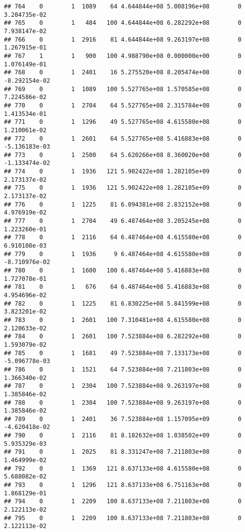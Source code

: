 \documentclass[
]{article}
\begin{document}
\begin{enumerate}
\begin{verbatim}
## 764    0        1  1089    64 4.644844e+08 5.008196e+08        0  3.204735e-02
## 765    0        1   484   100 4.644844e+08 6.282292e+08        0  7.938147e-02
## 766    0        1  2916    81 4.644844e+08 9.263197e+08        0  1.267915e-01
## 767    1        1   900   100 4.988790e+08 0.000000e+00        0  1.076149e-01
## 768    0        1  2401    16 5.275520e+08 8.205474e+08        0 -8.292154e-02
## 769    0        1  1089   100 5.527765e+08 1.570585e+08        0  7.224586e-02
## 770    0        1  2704    64 5.527765e+08 2.315784e+08        0  1.413534e-01
## 771    0        1  1296    49 5.527765e+08 4.615580e+08        0  1.210061e-02
## 772    0        1  2601    64 5.527765e+08 5.416883e+08        0 -5.136183e-03
## 773    0        1  2500    64 5.620266e+08 8.360020e+08        0 -1.133474e-02
## 774    0        1  1936   121 5.902422e+08 1.282105e+09        0  2.173137e-02
## 775    0        1  1936   121 5.902422e+08 1.282105e+09        0  2.173137e-02
## 776    0        1  1225    81 6.094381e+08 2.832152e+08        0  4.976919e-02
## 777    0        1  2704    49 6.487464e+08 3.205245e+08        0  1.223260e-01
## 778    0        1  2116    64 6.487464e+08 4.615580e+08        0  6.910108e-03
## 779    0        1  1936     9 6.487464e+08 4.615580e+08        0 -8.710976e-02
## 780    0        1  1600   100 6.487464e+08 5.416883e+08        0  1.727078e-01
## 781    0        1   676    64 6.487464e+08 5.416883e+08        0  4.954696e-02
## 782    0        1  1225    81 6.830225e+08 5.841599e+08        0  3.823201e-02
## 783    0        1  2601   100 7.310481e+08 4.615580e+08        0  2.120633e-02
## 784    0        1  2601   100 7.523884e+08 6.282292e+08        0  1.593079e-02
## 785    0        1  1681    49 7.523884e+08 7.133173e+08        0 -5.096778e-03
## 786    0        1  1521    64 7.523884e+08 7.211803e+08        0  1.366340e-02
## 787    0        1  2304   100 7.523884e+08 9.263197e+08        0  1.385846e-02
## 788    0        1  2304   100 7.523884e+08 9.263197e+08        0  1.385846e-02
## 789    0        1  2401    36 7.523884e+08 1.157095e+09        0 -4.620418e-02
## 790    0        1  2116    81 8.182632e+08 1.038502e+09        0  5.935329e-03
## 791    0        1  2025    81 8.331247e+08 7.211803e+08        0  1.464999e-02
## 792    0        1  1369   121 8.637133e+08 4.615580e+08        0  5.688082e-02
## 793    0        1  1296   121 8.637133e+08 6.751163e+08        0  1.868129e-01
## 794    0        1  2209   100 8.637133e+08 7.211803e+08        0  2.122113e-02
## 795    0        1  2209   100 8.637133e+08 7.211803e+08        0  2.122113e-02

\end{verbatim}
\end{enumerate}
\end{document}
